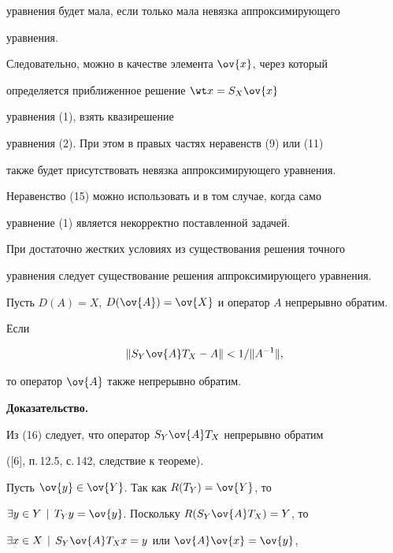 уравнения будет мала, если только мала невязка аппроксимирующего


уравнения.


Следовательно, можно в качестве элемента $\ov{x}$, через который


определяется приближенное решение $\wt x=S_X\ov{x}$


уравнения (1), взять квазирешение


уравнения (2). При этом в правых частях неравенств (9) или (11)


также будет присутствовать невязка аппроксимирующего уравнения.


Неравенство (15) можно использовать и в том случае, когда само


уравнение (1) является некорректно поставленной задачей.





При достаточно жестких условиях из существования решения точного


уравнения следует существование решения аппроксимирующего уравнения.





\begin{thm}


Пусть $D(A)=X$, $D(\ov{A})=\ov{X}$ и оператор $A$ непрерывно обратим.


Если


\begin{equation}


\nr{S_Y\ov{A} T_X-A} < 1/\nr{A^{-1}},


\end{equation}


то оператор $\ov{A}$ также непрерывно обратим.


\end{thm}





{\bf Доказательство.}


Из (16) следует, что оператор $S_Y\ov{A} T_X$ непрерывно обратим


([6], п.\,12.5, с.\,142, следствие к теореме).





Пусть $\ov{y}\in\ov{Y}$. Так как $R(T_Y)=\ov{Y}$, то


$\exists y\in Y \,\mid\, T_Yy=\ov{y}$. Поскольку $R(S_Y\ov{A} T_X)=Y$, то


$\exists x\in X \,\mid\, S_Y\ov{A} T_X x=y$ или $\ov{A}\ov{x} = \ov{y}$,


